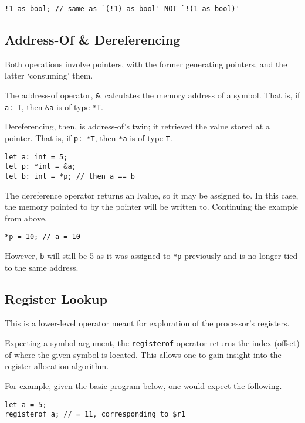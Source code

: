 \begin{lstlisting}[language=CustomLang]
!1 as bool; // same as `(!1) as bool' NOT `!(1 as bool)'
\end{lstlisting}

\subsection{Address-Of \& Dereferencing}\label{subsec:address-of-&-dereferencing}

Both operations involve pointers, with the former generating pointers, and the latter `consuming' them.

The address-of operator, \texttt{\&}, calculates the memory address of a symbol.
That is, if \texttt{a: T}, then \texttt{\&a} is of type \texttt{*T}.

Dereferencing, then, is address-of's twin; it retrieved the value stored at a pointer.
That is, if \texttt{p: *T}, then \texttt{*a} is of type \texttt{T}.

\begin{lstlisting}[language=CustomLang]
let a: int = 5;
let p: *int = &a;
let b: int = *p; // then a == b
\end{lstlisting}

The dereference operator returns an lvalue, so it may be assigned to.
In this case, the memory pointed to by the pointer will be written to.
Continuing the example from above,

\begin{lstlisting}[language=CustomLang]
*p = 10; // a = 10
\end{lstlisting}

However, \texttt{b} will still be 5 as it was assigned to \texttt{*p} previously and is no longer tied to the same address.

\subsection{Register Lookup}

This is a lower-level operator meant for exploration of the processor's registers.

Expecting a symbol argument, the \texttt{registerof} operator returns the index (offset) of where the given symbol is located.
This allows one to gain insight into the register allocation algorithm.

For example, given the basic program below, one would expect the following.

\begin{lstlisting}[language=CustomLang]
let a = 5;
registerof a; // = 11, corresponding to $r1
\end{lstlisting}

